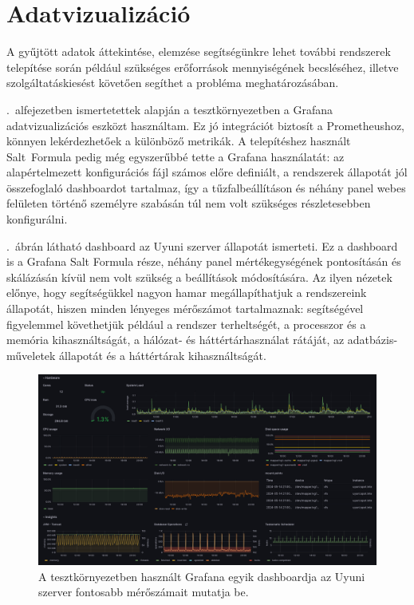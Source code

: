 \section{Adatvizualizáció}
A gyűjtött adatok áttekintése, elemzése segítségünkre lehet további rendszerek telepítése során például szükséges erőforrások mennyiségének becsléséhez, illetve szolgáltatáskiesést követően segíthet a probléma meghatározásában.

.~alfejezetben ismertetettek alapján a tesztkörnyezetben a Grafana adatvizualizációs eszközt használtam. Ez jó integrációt biztosít a Prometheushoz, könnyen lekérdezhetőek a különböző metrikák. A telepítéshez használt Salt~Formula pedig még egyszerűbbé tette a Grafana használatát: az alapértelmezett konfigurációs fájl számos előre definiált, a rendszerek állapotát jól összefoglaló dashboardot tartalmaz, így a tűzfalbeállításon és néhány panel webes felületen történő személyre szabásán túl nem volt szükséges részletesebben konfigurálni.

.~ábrán látható dashboard az Uyuni szerver állapotát ismerteti. Ez a dashboard is a Grafana Salt Formula része, néhány panel mértékegységének pontosításán és skálázásán kívül nem volt szükség a beállítások módosítására. Az ilyen nézetek előnye, hogy segítségükkel nagyon hamar megállapíthatjuk a rendszereink állapotát, hiszen minden lényeges mérőszámot tartalmaznak: segítségével figyelemmel követhetjük például a rendszer terheltségét, a processzor és a memória kihasználtságát, a hálózat- és háttértárhasználat rátáját, az adatbázis-műveletek állapotát és a háttértárak kihasználtságát.

\begin{figure}[ht]
	\centering
	\includegraphics[width=15cm]{figures/grafana-uyuni-server.png}
	\caption{A tesztkörnyezetben használt Grafana egyik dashboardja az Uyuni szerver fontosabb mérőszámait mutatja be.}
	\label{fig:grafana-uyuni-server}
\end{figure}

